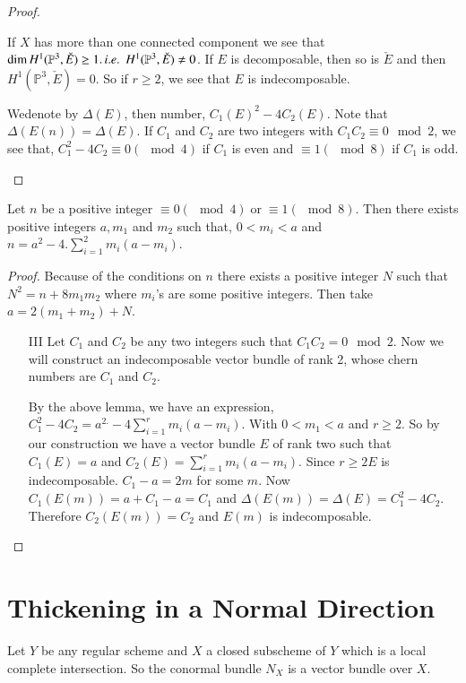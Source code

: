 \begin{proof}
\begin{itemize}
If $X$ has more than one connected component we see that\break $\dim H^1
(\mathbb{P}^3,\check{E})\geq 1.\, {i.e.}\kern.3em \, H^1(\mathbb{P}^3,\check{E})\neq
0$. If $E$ is decomposable, then so is $\check{E}$ and then
$H^1(\mathbb{P}^3, \check{E})=0$. So if $r\geq 2$, we see that $E$ is
indecomposable. 

We\pageoriginale denote by $\Delta(E)$, then number,
$C_1(E)^2-4C_2(E)$. Note that $\Delta(E(n))=\Delta(E)$. If $C_1$ and
$C_2$ are two integers with $C_1C_2\equiv 0\mod 2$, we see that,
$C_1^2-4C_2\equiv 0(\mod 4)$ if $C_1$ is even and $\equiv 1(\mod 8)$
if $C_1$ is odd.
\end{itemize}
\end{proof}

\begin{lem*}
Let $n$ be a positive integer $\equiv 0(\mod 4)\; \text{or} \; \equiv
1(\mod 8)$. Then there exists positive integers $a,m_1$ and $m_2$ such
that, $0<m_i<a$ and $n=a^2-4. \sum\limits_{i=1}^2m_i(a-m_i)$. 
\end{lem*}

\begin{proof}
Because of the conditions on $n$ there exists a positive integer $N$
such that $N^2=n+8m_1m_2$ where $m_i$'s are some positive
integers. Then take $a=2(m_1+m_2)+N$. 
\begin{itemize}
\item [III] Let $C_1$ and $C_2$ be any two integers such that
  $C_1C_2=0 \mod 2$. Now we will construct an indecomposable vector
  bundle of rank 2, whose chern numbers are $C_1$ and $C_2$. 

By the above lemma, we have an expression, $C_1^2-4C_2=a^{2.}-4
\sum\limits_{i=1}^r m_i(a-m_i)$. With $0<m_1<a$ and $r\geq 2$. So by
our construction we have a vector bundle $E$ of rank two such that
$C_1(E)=a$ and $C_2(E)=\sum\limits_{i=1}^rm_i(a-m_i)$. Since $r\geq 2
E$ is indecomposable. $C_1-a=2m$ for some $m$. Now
$C_1(E(m))=a+C_1-a=C_1$ and
$\Delta(E(m))=\Delta(E)=C_1^2-4C_2$. Therefore $C_2(E(m))=C_2$ and
$E(m)$ is indecomposable. 
\end{itemize}
\end{proof}

\section{Thickening in a Normal Direction}\label{chap4:sec2} 
Let $Y$ be any regular scheme and $X$ a closed subscheme of $Y$ which is a
local complete intersection. So the conormal bundle $N_X$ is a vector
bundle over $X$.


